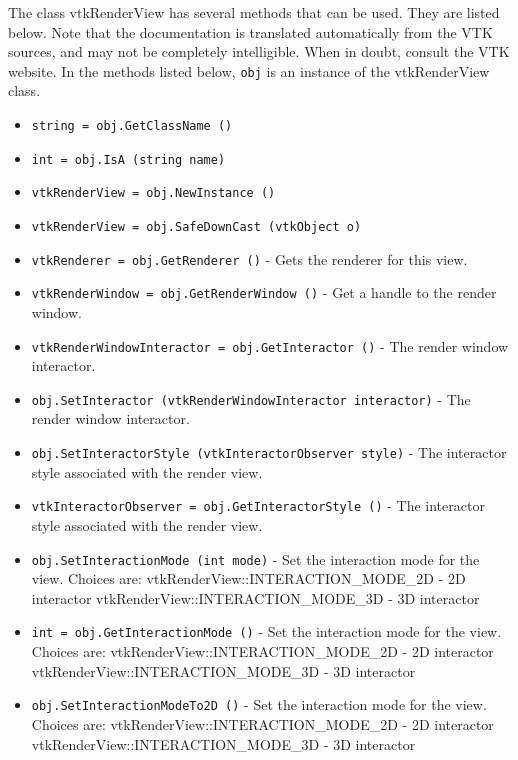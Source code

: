 The class vtkRenderView has several methods that can be used.
  They are listed below.
Note that the documentation is translated automatically from the VTK sources,
and may not be completely intelligible.  When in doubt, consult the VTK website.
In the methods listed below, \verb|obj| is an instance of the vtkRenderView class.
\begin{itemize}
\item  \verb|string = obj.GetClassName ()|

\item  \verb|int = obj.IsA (string name)|

\item  \verb|vtkRenderView = obj.NewInstance ()|

\item  \verb|vtkRenderView = obj.SafeDownCast (vtkObject o)|

\item  \verb|vtkRenderer = obj.GetRenderer ()| -  Gets the renderer for this view.

\item  \verb|vtkRenderWindow = obj.GetRenderWindow ()| -  Get a handle to the render window.

\item  \verb|vtkRenderWindowInteractor = obj.GetInteractor ()| -  The render window interactor.

\item  \verb|obj.SetInteractor (vtkRenderWindowInteractor interactor)| -  The render window interactor.

\item  \verb|obj.SetInteractorStyle (vtkInteractorObserver style)| -  The interactor style associated with the render view.

\item  \verb|vtkInteractorObserver = obj.GetInteractorStyle ()| -  The interactor style associated with the render view.

\item  \verb|obj.SetInteractionMode (int mode)| -  Set the interaction mode for the view. Choices are:
 vtkRenderView::INTERACTION\_MODE\_2D - 2D interactor
 vtkRenderView::INTERACTION\_MODE\_3D - 3D interactor

\item  \verb|int = obj.GetInteractionMode ()| -  Set the interaction mode for the view. Choices are:
 vtkRenderView::INTERACTION\_MODE\_2D - 2D interactor
 vtkRenderView::INTERACTION\_MODE\_3D - 3D interactor

\item  \verb|obj.SetInteractionModeTo2D ()| -  Set the interaction mode for the view. Choices are:
 vtkRenderView::INTERACTION\_MODE\_2D - 2D interactor
 vtkRenderView::INTERACTION\_MODE\_3D - 3D interactor


\end{itemize}
